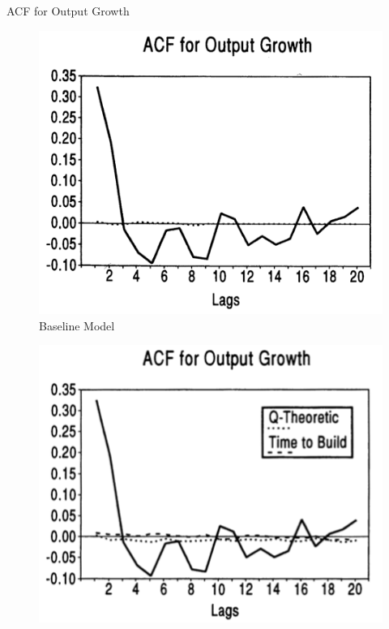\documentclass[10pt]{beamer}
\begin{document}
\begin{frame}{ACF for Output Growth} 
\begin{minipage}{0.33\textwidth}
\begin{figure}
  \centering
  \includegraphics[width=\linewidth]{Bse_ACF.png}
  \caption{Baseline Model}
\end{figure}
\end{minipage}%
\begin{minipage}{0.33\textwidth}
\begin{figure}
  \centering
  \includegraphics[width=\linewidth]{K_ACF.png}

\end{figure}
\end{minipage}
\end{frame}
\end{document}
